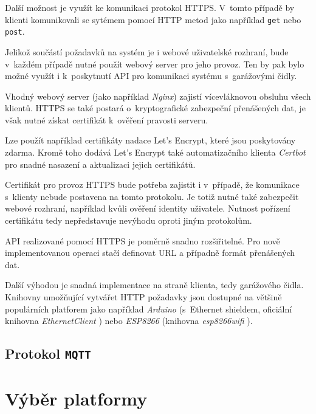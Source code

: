 \documentclass[thesis=M,czech]{FITthesis}[2012/06/26]
\begin{document}
Další možnost je využít ke komunikaci protokol HTTPS. V~tomto případě by klienti komunikovali se sytémem pomocí HTTP metod jako například \verb|get| nebo \verb|post|.

Jelikož součástí požadavků na systém je i webové uživatelské rozhraní, bude v~každém případě nutné použít webový server pro jeho provoz. Ten by pak bylo možné využít i k~poskytnutí API pro komunikaci systému s~garážovými čidly.

Vhodný webový server (jako například \textit{Nginx}) zajistí vícevláknovou obsluhu všech klientů. HTTPS se také postará o~kryptografické zabezpeční přenášených dat, je však nutné získat certifikát k~ověření pravosti serveru. 

Lze použít například certifikáty nadace Let's Encrypt, které jsou poskytovány  zdarma. Kromě toho dodává Let's Encrypt také automatizačního klienta \textit{Certbot} \cite{certbot} pro snadné nasazení a aktualizaci jejich certifikátů.

Certifikát pro provoz HTTPS bude potřeba zajistit i v~případě, že komunikace s~klienty nebude postavena na tomto protokolu. Je totiž nutné také zabezpečit webové rozhraní, například kvůli ověření identity uživatele. Nutnost pořízení certifikátu tedy nepředstavuje nevýhodu oproti jiným protokolům.

API realizované pomocí HTTPS je poměrně snadno rozšiřitelné. Pro nově implementovanou operaci stačí definovat URL a případně formát přenášených dat.

Další výhodou je snadná implementace na straně klienta, tedy garážového čidla. Knihovny umožňující vytvářet HTTP požadavky jsou dostupné na většině populárních platforem jako například \textit{Arduino} (s~Ethernet shieldem, oficiální knihovna \textit{EthernetClient} \cite{ard_web}) nebo \textit{ESP8266} (knihovna \textit{esp8266wifi} \cite{esp_web}).


\subsection{Protokol \texttt{MQTT}}

\section{Výběr platformy}
\end{document}
